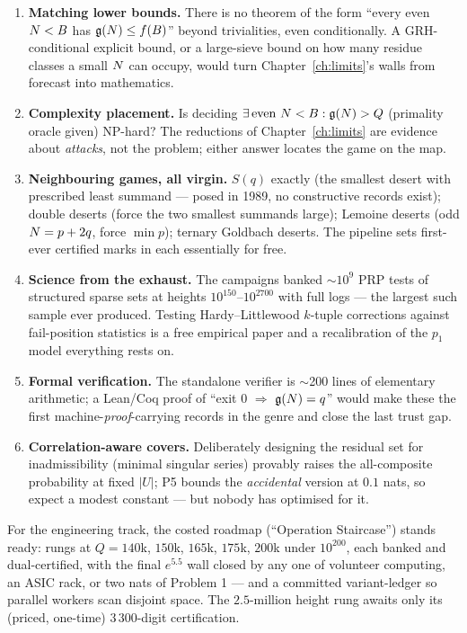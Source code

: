 \begin{enumerate}
changes height-game economics; an impossibility result would be a
certificate-complexity theorem. Untouched.
\item \textbf{Matching lower bounds.} There is no theorem of the form
``every even $N<B$ has $\mathfrak{g}(N)\le f(B)$'' beyond trivialities, even
conditionally. A GRH-conditional explicit bound, or a large-sieve bound
on how many residue classes a small $N$ can occupy, would turn
Chapter~\ref{ch:limits}'s walls from forecast into mathematics.
\item \textbf{Complexity placement.} Is deciding
$\exists\,\text{even }N<B:\mathfrak{g}(N)>Q$ (primality oracle given) NP-hard?
The reductions of Chapter~\ref{ch:limits} are evidence about
\emph{attacks}, not the problem; either answer locates the game on the
map.
\item \textbf{Neighbouring games, all virgin.} $S(q)$ exactly (the
smallest desert with prescribed least summand --- posed in 1989, no
constructive records exist); double deserts (force the two smallest
summands large); Lemoine deserts (odd $N=p+2q$, force $\min p$);
ternary Goldbach deserts. The pipeline sets first-ever certified marks
in each essentially for free.
\item \textbf{Science from the exhaust.} The campaigns banked
$\sim$$10^9$ PRP tests of structured sparse sets at heights
$10^{150}$--$10^{2700}$ with full logs --- the largest such sample ever
produced. Testing Hardy--Littlewood $k$-tuple corrections against
fail-position statistics is a free empirical paper and a recalibration
of the $p_1$ model everything rests on.
\item \textbf{Formal verification.} The standalone verifier is
$\sim$200 lines of elementary arithmetic; a Lean/Coq proof of
``exit 0 $\Rightarrow$ $\mathfrak{g}(N)=q$'' would make these the first
machine-\emph{proof}-carrying records in the genre and close the last
trust gap.
\item \textbf{Correlation-aware covers.} Deliberately designing the
residual set for inadmissibility (minimal singular series) provably
raises the all-composite probability at fixed $|U|$; P5 bounds the
\emph{accidental} version at $0.1$ nats, so expect a modest constant
--- but nobody has optimised for it.
\end{enumerate}

For the engineering track, the costed roadmap (``Operation
Staircase'') stands ready: rungs at $Q=140$k, $150$k, $165$k, $175$k,
$200$k under $10^{200}$, each banked and dual-certified, with the final
$e^{5.5}$ wall closed by any one of volunteer computing, an ASIC rack,
or two nats of Problem 1 --- and a committed variant-ledger so parallel
workers scan disjoint space. The $2.5$-million height rung awaits only
its (priced, one-time) $3\,300$-digit certification.

